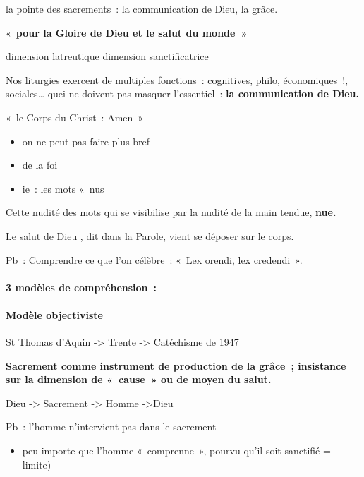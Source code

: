 la pointe des sacrements~: la communication de Dieu, la grâce.

«~\textbf{pour la Gloire de Dieu et le salut du monde~»}

dimension latreutique dimension sanctificatrice

Nos liturgies exercent de multiples fonctions~: cognitives, philo,
économiques~!, sociales\ldots{} quei ne doivent pas masquer
l'essentiel~: \textbf{la communication de Dieu.}

\begin{Ex}
 «~le Corps du Christ~: Amen~»

\begin{itemize}
\item
  on ne peut pas faire plus bref
\item
  de la foi
\item
  ie~: les mots «~nus
\end{itemize}

Cette nudité des mots qui se visibilise par la nudité de la main tendue,
\textbf{nue.}
\end{Ex}


Le salut de Dieu , dit dans la Parole, vient se déposer sur le corps.

Pb~: Comprendre ce que l'on célèbre~: «~Lex orendi, lex credendi~».

\paragraph{3 modèles de compréhension~:}

\hypertarget{moduxe8le-objectiviste}{%
\paragraph{Modèle objectiviste}\label{moduxe8le-objectiviste}}

St Thomas d'Aquin -\textgreater{} Trente -\textgreater{} Catéchisme de
1947

\textbf{Sacrement comme instrument de production de la grâce~;
insistance sur la dimension de «~cause~» ou de moyen du salut.}

Dieu -\textgreater{} Sacrement -\textgreater{} Homme -\textgreater Dieu

Pb~: l'homme n'intervient pas dans le sacrement

\begin{itemize}
\item
  peu importe que l'homme «~comprenne~», pourvu qu'il soit sanctifié =
  limite)
\end{itemize}

